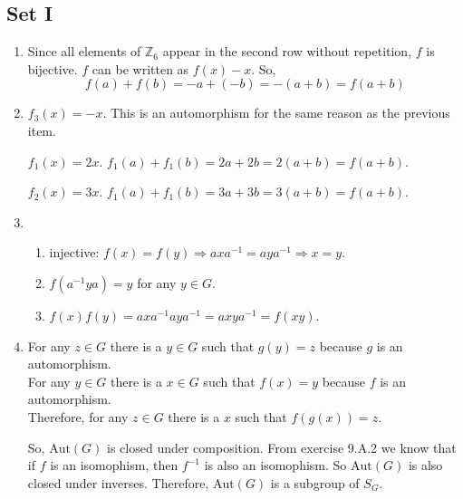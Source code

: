 \subsection{Set I}
\begin{enumerate}
    \item Since all elements of $ \mathbb{Z}_6 $ appear in the second row without repetition, $ f $ is bijective. $ f $ can be written as $ f(x) -x $. So,
    $$
        f(a) + f(b) = -a + (-b) = -(a + b) = f(a + b)
    $$

    \item $ f_3(x) = -x $. This is an automorphism for the same reason as the previous item.

    $ f_1(x) = 2x $. $ f_1(a) + f_1(b) = 2a + 2b = 2(a + b) = f(a + b) $.

    $ f_2(x) = 3x $. $ f_1(a) + f_1(b) = 3a + 3b = 3(a + b) = f(a + b) $.

    \item
        \begin{enumerate}
            \item injective: $ f(x) = f(y) \Rightarrow axa^{-1} = aya^{-1} \Rightarrow x = y $.

            \item $ f(a^{-1}ya) = y$ for any $ y \in G $.

            \item $ f(x)f(y) = axa^{-1}aya^{-1} = axya^{-1} = f(xy) $.
        \end{enumerate}

    \item
        For any $ z \in G $ there is a $ y \in G $ such that $ g(y) = z $ because $ g $ is an automorphism.\\
        For any $ y \in G $ there is a $ x \in G $ such that $ f(x) = y $ because $ f$ is an automorphism.\\
        Therefore, for any $ z \in G $ there is a $ x $ such that $ f(g(x)) = z $.

        So, $ \text{Aut}(G) $ is closed under composition. From exercise 9.A.2 we know that if $ f $ is an isomophism, then $ f^{-1} $ is also an isomophism. So $\text{Aut}(G)$ is also closed under inverses. Therefore, $\text{Aut}(G)$ is a subgroup of $ S_G $.
\end{enumerate}
